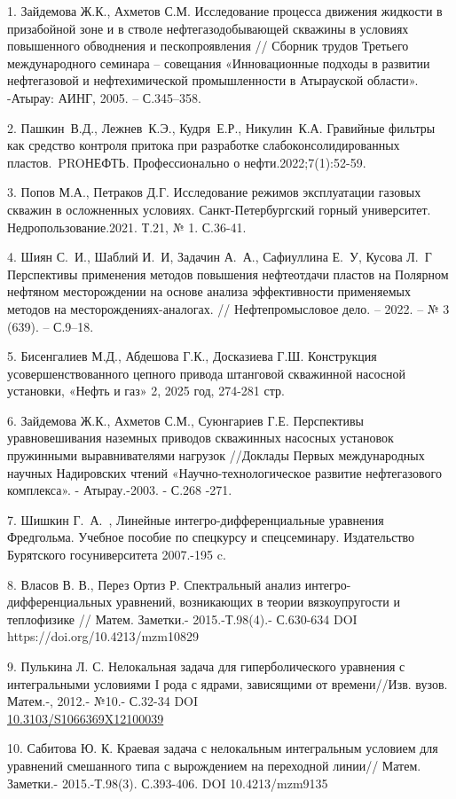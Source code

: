 \begin{references}
1. Зайдемова Ж.К., Ахметов С.М. Исследование процесса движения жидкости в
призабойной зоне и в стволе нефтегазодобывающей скважины в условиях
повышенного обводнения и пескопроявления // Сборник трудов Третьего
международного семинара -- совещания «Инновационные подходы в развитии
нефтегазовой и нефтехимической промышленности в Атырауской области».
-Атырау: АИНГ, 2005. -- С.345--358.

2. Пашкин~В.Д., Лежнев~К.Э., Кудря~Е.Р., Никулин~К.А. Гравийные фильтры
как средство контроля притока при разработке слабоконсолидированных
пластов.~PROНЕФТЬ. Профессионально о нефти.2022;7(1):52-59.~

3. Попов М.А., Петраков Д.Г. Исследование режимов эксплуатации газовых
скважин в осложненных условиях. Санкт-Петербургский горный университет.
Недропользование.2021. Т.21, № 1. С.36-41.

4. Шиян С.~И., Шаблий И.~И, Задачин А.~А., Сафиуллина Е.~У, Кусова Л.~Г
Перспективы применения методов повышения нефтеотдачи пластов на Полярном
нефтяном месторождении на основе анализа эффективности применяемых
методов на месторождениях-аналогах. // Нефтепромысловое дело. -- 2022.
-- № 3 (639). -- С.9--18.

5. Бисенгалиев М.Д., Абдешова Г.К., Досказиева Г.Ш. Конструкция
усовершенствованного цепного привода штанговой скважинной насосной
установки, «Нефть и газ» 2, 2025 год, 274-281 стр.

6. Зайдемова Ж.К., Ахметов С.М., Суюнгариев Г.Е. Перспективы
уравновешивания наземных приводов скважинных насосных установок
пружинными выравнивателями нагрузок //Доклады Первых международных
научных Надировских чтений «Научно-технологическое развитие
нефтегазового комплекса». - Атырау.-2003. - С.268 -271.

7. Шишкин Г.~А.~, Линейные интегро-дифференциальные уравнения
Фредгольма. Учебное пособие по спецкурсу и спецсеминару. Издательство
Бурятского госуниверситета 2007.-195 c.

8. Власов В. В., Перез Ортиз Р. Спектральный анализ
интегро-дифференциальных уравнений, возникающих в теории вязкоупругости
и теплофизике // Матем. Заметки.- 2015.-Т.98(4).- С.630-634
DOI https://doi.org/10.4213/mzm10829

9. Пулькина Л. С. Нелокальная задача для гиперболического уравнения с
интегральными условиями I рода с ядрами, зависящими от времени//Изв.
вузов. Матем.-, 2012.- №10.- С.32-34
DOI\\\href{https://doi.org/10.3103/S1066369X12100039}{10.3103/S1066369X12100039}

10. Сабитова Ю. К. Краевая задача с нелокальным интегральным условием
для уравнений смешанного типа с вырождением на переходной линии// Матем.
Заметки.- 2015.-Т.98(3). С.393-406. DOI 10.4213/mzm9135
\end{references}

